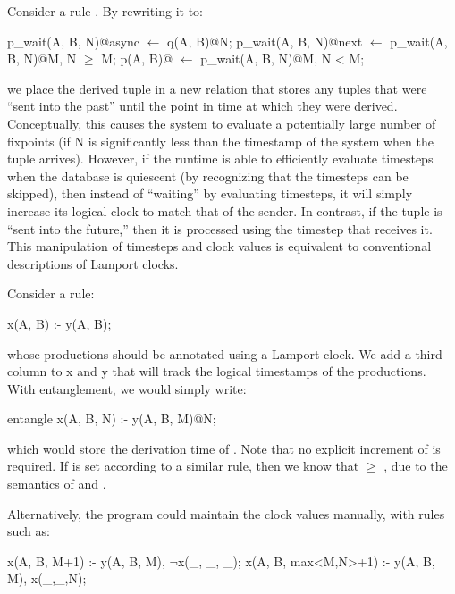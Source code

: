 Consider a rule .  By
rewriting it to:

\begin{Dedalus}
p\_wait(A, B, N)@async \(\leftarrow\) q(A, B)@N;
p\_wait(A, B, N)@next \(\leftarrow\) p\_wait(A, B, N)@M, N \(\ge\) M;
p(A, B)@ \(\leftarrow\) p\_wait(A, B, N)@M, N < M;
\end{Dedalus}

we place the derived tuple in a new relation  that
stores any tuples that were ``sent into the past'' until the point in
time at which they were derived.  Conceptually, this causes the system
to evaluate a potentially large number of fixpoints (if N is
significantly less than the timestamp of the system when the tuple
arrives).  However, if the runtime is able to efficiently evaluate
timesteps when the database is quiescent (by recognizing that the
timesteps can be skipped), then instead of ``waiting'' by evaluating
timesteps, it will simply increase its logical clock to match that of
the sender.  In contrast, if the tuple is ``sent into the future,''
then it is processed using the timestep that receives it.  This
manipulation of timesteps and clock values is equivalent to
conventional descriptions of Lamport clocks. 


Consider a rule:
\begin{Dedalus}
x(A, B) :- y(A, B);
\end{Dedalus}
whose productions should be annotated using a Lamport clock.  We add a
third column to x and y that will track the logical timestamps of the
productions.  With entanglement, we would simply write:

\begin{Dedalus}
entangle
x(A, B, N) :- y(A, B, M)@N;
\end{Dedalus}

which would store the derivation time of .  Note that no explicit
increment of  is required.  If  is set according to a similar
rule, then we know that  $\ge$ , due to the semantics of
 and .

Alternatively, the program could maintain the clock values manually,
with rules such as:

\begin{Dedalus}
x(A, B, M+1) :- y(A, B, M), \(\neg\)x(_, _, _);
x(A, B, max<M,N>+1) :- y(A, B, M), x(_,_,N); 
\end{Dedalus}

